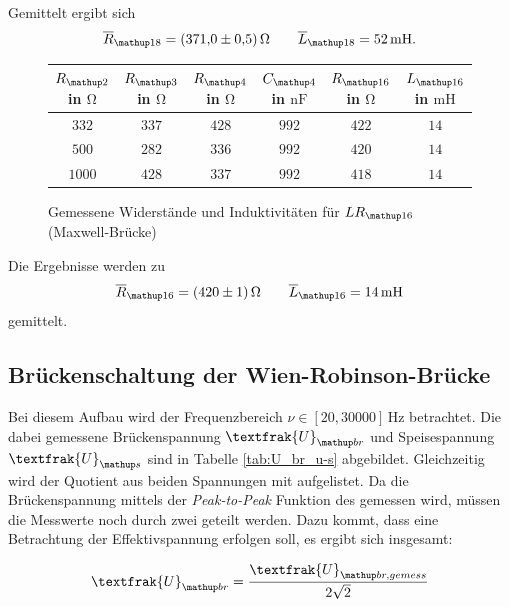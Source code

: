Gemittelt ergibt sich
\begin{equation}
\label{eq:wert_lr_16_max}
\overline{R}_{\map{18}}=\SI{371\pm0.5}{\ohm} \qquad \overline{L}_{\map{18}}=\SI{52}{\milli\henry}.
\end{equation}


\begin{figure}
\centering
\caption{Gemessene Widerstände und Induktivitäten für $LR\ua{16}$ (Maxwell-Brücke)}
  \label{tab:lc_r16_max}
\begin{tabular}{S S S S S S }
    \toprule
    {$R\ua{2}$  in $\si{\ohm}$} &  {$R\ua{3}$ in $\si{\ohm}$} & {$R\ua{4}$ in $\si{\ohm}$} & {$C\ua{4}$ in $\si{\nano\farad}$}& {$R\ua{16}$ in $\si{\ohm}$} &  {$L\ua{16}$ in $\si{\milli\henry}$} \\
    \midrule
     {$\num{332}$} & {$\num{337}$} &  {$\num{428}$}& {$\num{992}$}  &  {$\num{422}$} & {$\num{14}$}\\
     {$\num{500}$} & {$\num{282}$}  & {$\num{336}$} & {$\num{992}$} & {$\num{420}$} & {$\num{14}$}\\
     {$\num{1000}$} & {$\num{428}$}  & {$\num{337}$} & {$\num{992}$} &{$\num{418}$} & {$\num{14}$}  \\
    \bottomrule
  \end{tabular}
 \end{figure}


Die Ergebnisse werden zu %
\begin{equation}
\label{eq:wert_lr_16_max}
\overline{R}_{\map{16}}=\SI{420\pm1}{\ohm} \qquad \overline{L}_{\map{16}}=\SI{14}{\milli\henry}
\end{equation}
gemittelt.

\subsection{Brückenschaltung der Wien-Robinson-Brücke}

Bei diesem Aufbau wird der Frequenzbereich $\nu\in\left[20,30000\right]\,\si{\hertz}$ betrachtet.
Die dabei gemessene Brückenspannung $\textfrak{U}\ua{br}$ und Speisespannung $\textfrak{U}\ua{s}$ sind in Tabelle \ref{tab:U_br_u-s} abgebildet.
Gleichzeitig wird der Quotient aus beiden Spannungen mit aufgelistet.
Da die Brückenspannung mittels der \emph{Peak-to-Peak} Funktion des gemessen wird,
müssen die Messwerte noch durch zwei geteilt werden. Dazu kommt, dass eine Betrachtung der Effektivspannung erfolgen soll, es ergibt sich insgesamt:


\begin{equation*}
\textfrak{U}\ua{br}=\frac{\textfrak{U}\ua{br,gemess}}{2\sqrt{2}}
\end{equation*}



